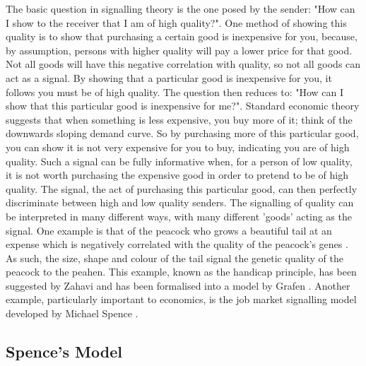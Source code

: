 \documentclass[a4paper,10pt]{article}
\numberwithin{equation}{section}
\begin{document}
The basic question in signalling theory is the one posed by the sender: "How can I show to the receiver that I am of high quality?". One method of showing this quality is to show that purchasing a certain good is inexpensive for you, because, by assumption, persons with higher quality will pay a lower price for that good. Not all goods will have this negative correlation with quality, so not all goods can act as a signal. By showing that a particular good is inexpensive for you, it follows you must be of high quality. The question then reduces to: "How can I show that this particular good is inexpensive for me?". Standard economic theory suggests that when something is less expensive, you buy more of it; think of the downwards sloping demand curve. So by purchasing more of this particular good, you can show it is not very expensive for you to buy, indicating you are of high quality. Such a signal can be fully informative when, for a person of low quality, it is not worth purchasing the expensive good in order to pretend to be of high quality. The signal, the act of purchasing this particular good, can then perfectly discriminate between high and low quality senders. The signalling of quality can be interpreted in many different ways, with many different 'goods' acting as the signal. One example is that of the peacock who grows a beautiful tail at an expense which is negatively correlated with the quality of the peacock's genes \cite{MaynardSmith2003}. As such, the size, shape and colour of the tail signal the genetic quality of the peacock to the peahen. This example, known as the handicap principle, has been suggested by Zahavi and has been formalised into a model by Grafen \cite{Zahavi1975, Grafen1990}. Another example, particularly important to economics, is the job market signalling model developed by Michael Spence \cite{Spence1973}.

\subsection{Spence's Model}
\label{sec:Spence's Model}
\end{document}
